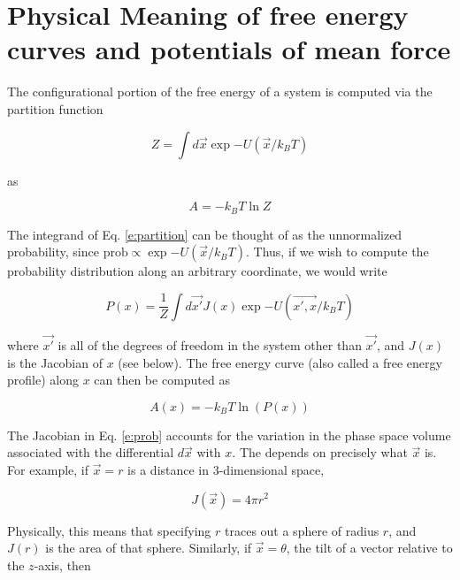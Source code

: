 
\section{Physical Meaning of free energy curves and potentials of mean force}
\label{s:phys_mean}

The configurational portion of the free energy of a system is computed via the partition function

\begin{equation}
    \label{e:partition}
    Z = \int d\vec{x} \exp{-U(\vec{x}/k_B T)}
\end{equation}

as

\begin{equation}
    A = -k_B T \ln Z
\end{equation}

The integrand of Eq. \ref{e:partition} can be thought of as the unnormalized
probability, since $\mathrm{prob} \propto \exp{-U(\vec{x}/k_B T)}$.  Thus, if we wish to compute the probability distribution along an arbitrary coordinate, we would write

\begin{equation}
    \label{e:prob}
    P(x) = \frac{1}{Z} \int d\vec{x'} J(x) \exp{-U(\vec{x', x}/k_B T)}
\end{equation}

\noindent where $\vec{x'}$ is all of the degrees of freedom in the system other
than $\vec{x'}$, and $J(x)$ is the Jacobian of $x$ (see below).  The free energy curve (also called a free energy profile) along $x$ can then be computed
as

\begin{equation}
    \label{e:free}
    A(x) = - k_B T \ln(P(x))
\end{equation}


The Jacobian in Eq. \ref{e:prob} accounts for the variation in the phase space
volume associated with the differential $d\vec{x}$ with $x$.  The depends on
precisely what $\vec{x}$ is. For example, if $\vec{x} = r $ is a distance in
3-dimensional space,

\begin{equation}
J(\vec{x}) = 4 \pi r^2
\end{equation}

\noindent Physically, this means that specifying $r$ traces out a sphere of
radius $r$, and $J(r)$ is the area of that sphere.  Similarly, if $\vec{x}=
\theta$, the tilt of a vector relative to the $z$-axis, then

